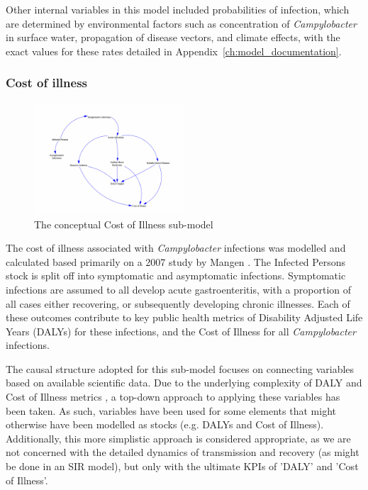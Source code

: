 Other internal variables in this model included probabilities of infection, which are determined by environmental factors such as concentration of \textit{Campylobacter} in surface water, propagation of disease vectors, and climate effects, with the exact values for these rates detailed in Appendix~\ref{ch:model_documentation}.


\subsubsection*{Cost of illness}
\begin{figure}[h]
\centering
\includegraphics[width=0.5\textwidth]{images/COI_submodel.png}
\caption{The conceptual Cost of Illness sub-model}
\end{figure}
The cost of illness associated with \textit{Campylobacter} infections was modelled and calculated based primarily on a 2007 study by Mangen \parencite{mangen_campylobacteriosis_2007}. The Infected Persons stock is split off into symptomatic and asymptomatic infections. Symptomatic infections are assumed to all develop acute gastroenteritis, with a proportion of all cases either recovering, or subsequently developing chronic illnesses. Each of these outcomes contribute to key public health metrics of Disability Adjusted Life Years (DALYs) for these infections, and the Cost of Illness for all \textit{Campylobacter} infections. 

The causal structure adopted for this sub-model focuses on connecting variables based on available scientific data. Due to the underlying complexity of DALY and Cost of Illness metrics \parencite{jo_cost--illness_2014}, a top-down approach to applying these variables has been taken. As such, variables have been used for some elements that might otherwise have been modelled as stocks (e.g. DALYs and Cost of Illness). Additionally, this more simplistic approach is considered appropriate, as we are not concerned with the detailed dynamics of transmission and recovery (as might be done in an SIR model), but only with the ultimate KPIs of 'DALY' and 'Cost of Illness'.

